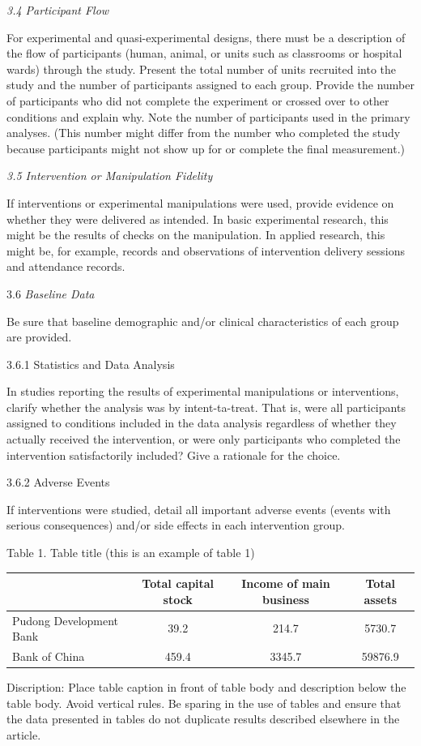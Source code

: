 \documentclass[twoside,10.5pt]{article}%
\begin{document}
\emph{3.4 Participant Flow}

For experimental and quasi-experimental designs, there must be a description of the flow of participants (human, animal, or units such as classrooms or
hospital wards) through the study. Present the total number of units recruited into the study and the number of participants assigned to each group. Provide the number of participants who did not complete the experiment or crossed over to other conditions and explain why. Note the number of participants used in the primary analyses. (This number might differ from the number who completed the study because participants might not show up for or complete the final measurement.)

\emph{3.5 Intervention or Manipulation Fidelity }

If interventions or experimental manipulations were used, provide evidence on whether they were delivered as intended. In basic experimental research,
this might be the results of checks on the manipulation. In applied research, this might be, for example, records and observations of intervention delivery sessions and attendance records.

$3.6$ \emph{Baseline Data}

Be sure that baseline demographic and/or clinical characteristics of each group are provided.

3.6.1 Statistics and Data Analysis

In studies reporting the results of experimental manipulations or interventions, clarify whether the analysis was by intent-ta-treat. That is, were all participants assigned to conditions included in the data analysis regardless of whether they actually received the intervention, or were only participants who completed the intervention satisfactorily included? Give a rationale for the choice.

3.6.2 Adverse Events

If interventions were studied, detail all important adverse events (events with serious consequences) and/or side effects in each intervention group.

\vspace{0.3cm}
Table 1. Table title (this is an example of table 1) \vspace{-0.3cm}
\begin{center}
\begin{tabular}{lccc}\hline
{} & Total capital stock & Income of main business & Total assets \\\hline
Pudong Development Bank & 39.2 & 214.7 & 5730.7 \\
Bank of China & 459.4 & 3345.7 & 59876.9 \\\hline
\end{tabular}
\end{center}\vspace{-0.3cm}
Discription: Place table caption in front of table body and description below the table body. Avoid vertical rules. Be sparing in the use of tables and ensure that the data presented in tables do not duplicate results described elsewhere in the article.
\vspace{0.3cm}
\end{document}
